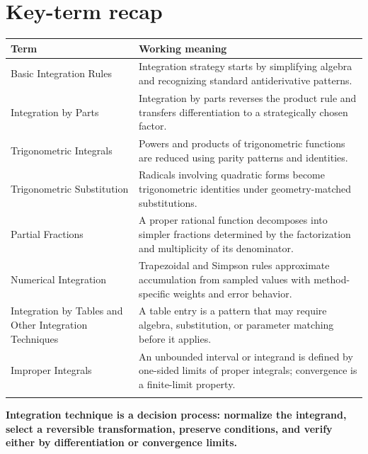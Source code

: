 \documentclass[11pt]{article}
\begin{document}
\section{Key-term recap}
\small
\begin{longtable}{@{}>{\RaggedRight\arraybackslash}p{}>{\RaggedRight\arraybackslash}p{}@{}}
\toprule
\textbf{Term} & \textbf{Working meaning}\\
\midrule\endhead
Basic Integration Rules & Integration strategy starts by simplifying algebra and recognizing standard antiderivative patterns. \\\addlinespace[2pt]
Integration by Parts & Integration by parts reverses the product rule and transfers differentiation to a strategically chosen factor. \\\addlinespace[2pt]
Trigonometric Integrals & Powers and products of trigonometric functions are reduced using parity patterns and identities. \\\addlinespace[2pt]
Trigonometric Substitution & Radicals involving quadratic forms become trigonometric identities under geometry-matched substitutions. \\\addlinespace[2pt]
Partial Fractions & A proper rational function decomposes into simpler fractions determined by the factorization and multiplicity of its denominator. \\\addlinespace[2pt]
Numerical Integration & Trapezoidal and Simpson rules approximate accumulation from sampled values with method-specific weights and error behavior. \\\addlinespace[2pt]
Integration by Tables and Other Integration Techniques & A table entry is a pattern that may require algebra, substitution, or parameter matching before it applies. \\\addlinespace[2pt]
Improper Integrals & An unbounded interval or integrand is defined by one-sided limits of proper integrals; convergence is a finite-limit property. \\\addlinespace[2pt]
\bottomrule
\end{longtable}
\normalsize

\enlargethispage{4\baselineskip}
\begin{tcolorbox}[title=One-sentence takeaway,fonttitle=\bfseries,colback=Ink,colframe=Ink,coltext=white,coltitle=white,arc=2mm,boxrule=0pt]
\centering\bfseries Integration technique is a decision process: normalize the integrand, select a reversible transformation, preserve conditions, and verify either by differentiation or convergence limits.
\end{tcolorbox}
\end{document}
